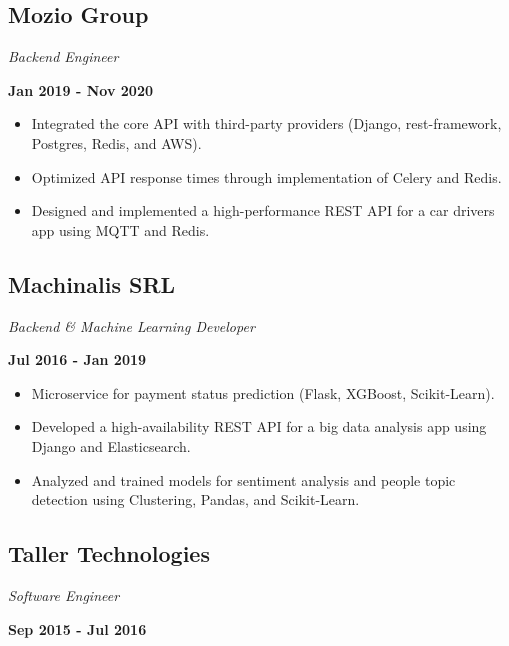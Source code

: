 {{{\subsection{Mozio Group}\textit{Backend Engineer}{\textcolor{subsectioncolor}{\textbf{\hfill Jan 2019 - Nov 2020}}
{
  \begin{itemize}[itemsep=-3pt] %
    \item {Integrated the core API with third-party providers (Django, rest-framework, Postgres, Redis, and AWS).}
    \item {Optimized API response times through implementation of Celery and Redis.}
    \item {Designed and implemented a high-performance REST API for a car drivers app using MQTT and Redis.}
  \end{itemize}
}

\subsection{Machinalis SRL}\textit{Backend \& Machine Learning Developer}{\textcolor{subsectioncolor}{\textbf{\hfill Jul 2016 - Jan 2019}}
{
  \begin{itemize}[itemsep=-3pt] %
    \item {Microservice for payment status prediction (Flask, XGBoost, Scikit-Learn).}
    \item {Developed a high-availability REST API for a big data analysis app using Django and Elasticsearch.}
    \item {Analyzed and trained models for sentiment analysis and people topic detection using Clustering, Pandas, and Scikit-Learn.}
  \end{itemize}
}


\subsection{\small Taller Technologies}\textit{\small Software Engineer}{\textcolor{subsectioncolor}{\textbf{\hfill \small Sep 2015 - Jul 2016}}

}}}}}}
